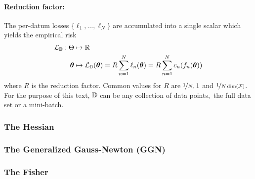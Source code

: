 \paragraph{Reduction factor:} The per-datum losses $\{\ell_1, \dots, \ell_N\}$ are accumulated into a single scalar which yields the empirical risk
\begin{align*}
  {\mathcal{L}}_{{\mathbb{D}}}: \Theta & \mapsto {\mathbb{R}}
  \\
  {\bm{\theta}}           & \mapsto {\mathcal{L}}_{{\mathbb{D}}}({\bm{\theta}}) = R \sum_{n=1}^N \ell_n({\bm{\theta}}) = R \sum_{n=1}^N c_n(f_n({\bm{\theta}}))
\end{align*}
where $R$ is the reduction factor. Common values for $R$ are $\nicefrac{1}{N}, 1$ and $\nicefrac{1}{N \dim({\mathcal{F}})}$.
For the purpose of this text, ${\mathbb{D}}$ can be any collection of data points, \eg\,the full data set or a mini-batch.

\subsubsection{The Hessian}\label{sec:basics_dl_hessian}


\subsubsection{The Generalized Gauss-Newton (GGN)}


\subsubsection{The Fisher}\label{sec:fisher}


